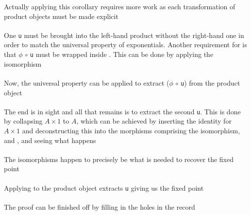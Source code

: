 \begin{AgdaMultiCode}
Actually applying this corollary requires more work as each transformation of product
objects must be made explicit \\
 \\
One \verb|u| must be brought into the left-hand product without the right-hand
one in order to match the universal property of exponentials. Another
requirement for  is that $\phi$ $\circ$ \verb|u| must
be wrapped inside . This can be done by applying the
 isomorphism \\
 \\
Now, the universal property can be applied to extract 
($\phi$ $\circ$ \verb|u|) from the product object \\
 \\
The end is in sight and all that remains is to extract the second \verb|u|. This
is done by
collapsing $A \times 1$ to $A$, which can be achieved by inserting the identity
for $A \times 1$ and deconstructing this into the morphisms comprising the
isomorphism,  and , and seeing what
happens \\
 \\
The isomorphisms happen to precisely be what is needed to recover the fixed
point \\
 \\
Applying  to the product object  extracts \verb|u| giving us
the fixed point \\
 \\
The proof can be finished off by filling in the holes in the record \\
\end{AgdaMultiCode}

